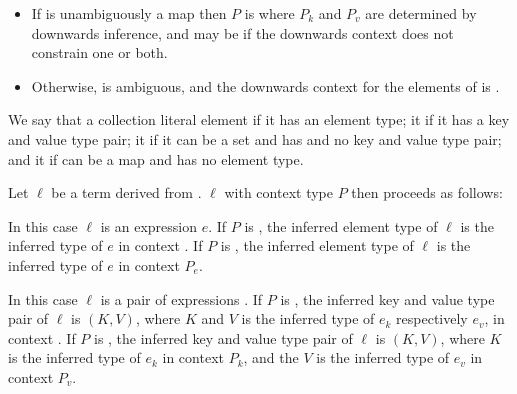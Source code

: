 \documentclass[makeidx]{article}
\begin{document}
{\begin{itemize}
\item
  If  is unambiguously a map
  then $P$ is 
  where $P_k$ and $P_v$ are determined by downwards inference,
  and may be \FreeContext{}
  if the downwards context does not constrain one or both.
\item
  Otherwise,  is ambiguous,
  and the downwards context for the elements of 
  is \FreeContext.
\end{itemize}

\LMHash{}%
We say that a collection literal element
if it has an element type;
it
if it has a key and value type pair;
it
if it can be a set and has and no key and value type pair;
and it
if can be a map and has no element type.

\LMHash{}%
Let $\ell$ be a term derived from .
$\ell$ with context type $P$ then proceeds
as follows:

\LMHash{}%
In this case $\ell$ is an expression $e$.
%
If $P$ is \FreeContext,
the inferred element type of $\ell$ is
the inferred type of $e$ in context \FreeContext.
%
If $P$ is ,
the inferred element type of $\ell$ is
the inferred type of $e$ in context $P_e$.
\EndCase

\LMHash{}%
In this case $\ell$ is a pair of expressions .
%
If $P$ is \FreeContext{},
the inferred key and value type pair of $\ell$ is $(K, V)$,
where $K$ and $V$ is
the inferred type of $e_k$ respectively $e_v$,
in context \FreeContext.
%
If $P$ is ,
the inferred key and value type pair of $\ell$ is $(K, V)$,
where $K$ is
the inferred type of $e_k$ in context $P_k$, and
the $V$ is
the inferred type of $e_v$ in context $P_v$.
\EndCase

}
\end{document}
